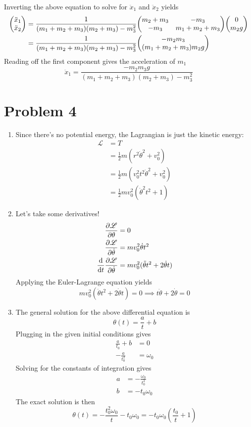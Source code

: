 \documentclass[12pt]{article}
\begin{document}
\begin{enumerate}[label=(\alph*)]
    Inverting the above equation to solve for $\ddot{x}_1$ and $\ddot{x}_2$ yields
    \begin{align*}
        \mqty(\ddot{x}_1 \\ \ddot{x}_2) &= \frac{1}{(m_1+m_2+m_3)(m_2+m_3) - m_3^2}\mqty(m_2+m_3 & -m_3 \\ -m_3 & m_1+m_2+m_3)\mqty(0 \\ m_2g) \\
        &= \frac{1}{(m_1+m_2+m_3)(m_2+m_3) - m_3^2}\mqty(-m_2m_3 \\ (m_1+m_2+m_3)m_2g)
    \end{align*}
    Reading off the first component gives the acceleration of $m_1$
    \[ \boxed{\ddot{x}_1 = \frac{-m_2m_3g}{(m_1+m_2+m_3)(m_2+m_3) - m_3^2}} \]
\end{enumerate}



\section*{Problem 4}
\begin{enumerate}[label=(\alph*)]
    \item Since there's no potential energy, the Lagrangian is just the kinetic energy:
    \begin{align*}
        \mathscr{L} &= T \\
        &= \frac{1}{2}m(r^2\dot{\theta}^2 + v_0^2) \\
        &= \frac{1}{2}m(v_0^2t^2\dot{\theta}^2 + v_0^2) \\
        &= \boxed{\frac{1}{2}mv_0^2(\dot{\theta}^2t^2 + 1)}
    \end{align*}
    \item Let's take some derivatives!
    \begin{align*}
        \pdv{\mathscr{L}}{\theta} &= 0 \\
        \pdv{\mathscr{L}}{\dot{\theta}} &= mv_0^2\dot{\theta}t^2 \\
        \dv{t}\pdv{\mathscr{L}}{\dot{\theta}} &= mv_0^2(\ddot{\theta}t^2 + 2\dot{\theta}t)
    \end{align*}
    Applying the Euler-Lagrange equation yields
    \[ mv_0^2(\ddot{\theta}t^2 + 2\dot{\theta}t) = 0 \implies \boxed{t\ddot{\theta} + 2\dot{\theta} = 0}\]
    \item The general solution for the above differential equation is
    \[ \theta(t) = \frac{a}{t} + b \]
    Plugging in the given initial conditions gives
    \begin{align*}
        \frac{a}{t_0} + b &= 0 \\
        -\frac{a}{t_0^2} &= \omega_0
    \end{align*}
    Solving for the constants of integration gives
    \begin{align*}
        a &= -\frac{\omega_0}{t_0^2} \\
        b &= -t_0\omega_0
    \end{align*}
    The exact solution is then
    \[ \boxed{\theta(t) = -\frac{t_0^2\omega_0}{t} - t_0\omega_0 = -t_0\omega_0\left(\frac{t_0}{t} + 1\right)} \]
\end{enumerate}
\end{document}
